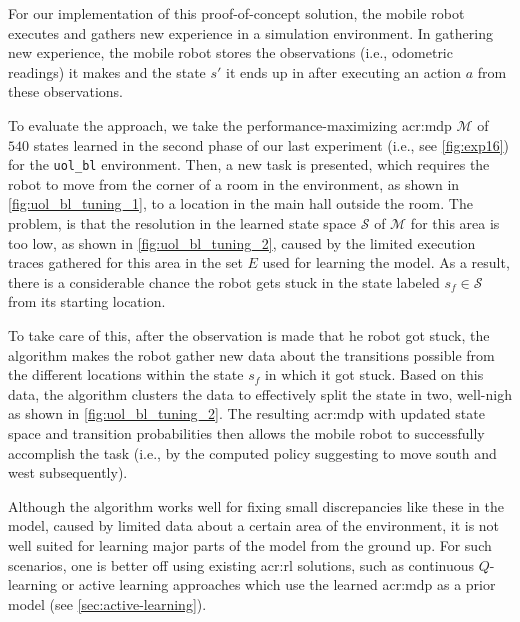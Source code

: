 For our implementation of this proof-of-concept solution, the mobile robot executes and gathers new experience in a simulation environment.
In gathering new experience, the mobile robot stores the observations (i.e., odometric readings) it makes and the state $s'$ it ends up in after executing an action $a$ from these observations.

To evaluate the approach, we take the performance-maximizing \acrshort{acr:mdp} $\mathcal{M}$ of $540$ states learned in the second phase of our last experiment (i.e., see \autoref{fig:exp16}) for the \texttt{uol\_bl} environment.
Then, a new task is presented, which requires the robot to move from the corner of a room in the environment, as shown in \autoref{fig:uol_bl_tuning_1}, to a location in the main hall outside the room.
The problem, is that the resolution in the learned state space $\mathcal{S}$ of $\mathcal{M}$ for this area is too low, as shown in \autoref{fig:uol_bl_tuning_2}, caused by the limited execution traces gathered for this area in the set $E$ used for learning the model.
As a result, there is a considerable chance the robot gets stuck in the state labeled $s_f \in \mathcal{S}$ from its starting location.

To take care of this, after the observation is made that he robot got stuck, the algorithm makes the robot gather new data about the transitions possible from the different locations within the state $s_f$ in which it got stuck.
Based on this data, the algorithm clusters the data to effectively split the state in two, well-nigh as shown in \autoref{fig:uol_bl_tuning_2}.
The resulting \acrshort{acr:mdp} with updated state space and transition probabilities then allows the mobile robot to successfully accomplish the task (i.e., by the computed policy suggesting to move south and west subsequently).

Although the algorithm works well for fixing small discrepancies like these in the model, caused by limited data about a certain area of the environment, it is not well suited for learning major parts of the model from the ground up.
For such scenarios, one is better off using existing \acrshort{acr:rl} solutions, such as continuous $Q$-learning or active learning approaches which use the learned \acrshort{acr:mdp} as a prior model (see \autoref{sec:active-learning}).